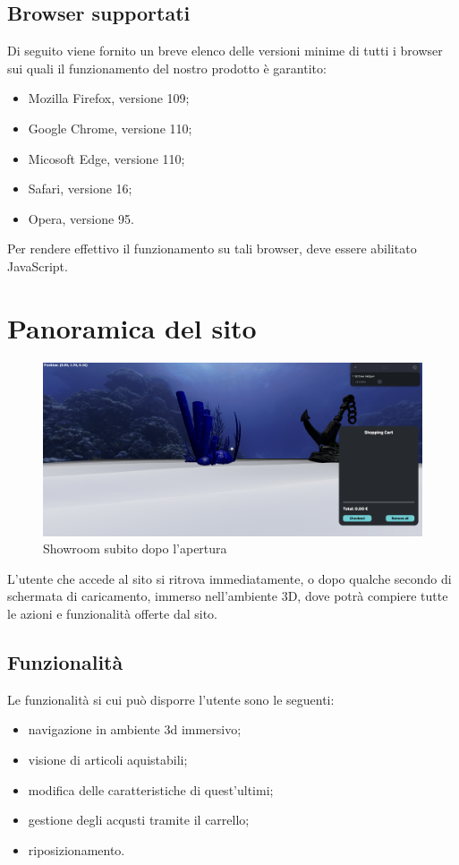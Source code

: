 \subsection{Browser supportati}
Di seguito viene fornito un breve elenco delle versioni minime di tutti i browser sui quali
il funzionamento del nostro prodotto è garantito:
\begin{itemize}
	\item Mozilla Firefox, versione 109;
	\item Google Chrome, versione 110;
	\item Micosoft Edge, versione 110;
	\item Safari, versione 16;
	\item Opera, versione 95.
\end{itemize}
Per rendere effettivo il funzionamento su tali browser, deve essere abilitato JavaScript.
\pagebreak



\section{Panoramica del sito}
\begin{figure}[H]
  \renewcommand{\thefigure}{1}
  \includegraphics[width=\linewidth]{./res/images/schermata_iniziale.png}
  \caption{Showroom subito dopo l'apertura}
  \label{Showroom subito dopo l'apertura}
\end{figure}
L'utente che accede al sito si ritrova immediatamente, o dopo qualche secondo di schermata di caricamento, immerso nell'ambiente 3D, dove potrà compiere tutte le azioni e funzionalità offerte dal sito. 
\subsection{Funzionalità}
Le funzionalità si cui può disporre l'utente sono le seguenti:
\begin{itemize}
\item navigazione in ambiente 3d immersivo;
\item visione di articoli aquistabili;
\item modifica delle caratteristiche di quest'ultimi;
\item gestione degli acqusti tramite il carrello;
\item riposizionamento.
\end{itemize}
\pagebreak

